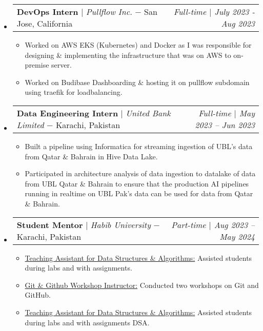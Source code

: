 \documentclass[letterpaper,10pt]{article}
\makeatletter
\newcommand{\subheadingtitlevspace}{
\vspace{-3pt}
}
\newcommand{\resumeItem}[1]{
  \item{
    {#1 \vspace{-4pt}}
  }
}
\newcommand{\titleItem}[1]{
  \textbf{#1}
}
\newcommand{\resumeSubheading}[4]{
  \item
     \begin{tabular*}{0.97\textwidth}[t]{l@{\extracolsep{\fill}}l@{}l}     
      {#1} & \titleItem{#3} | {#2} & \textit{#4}\\
    \end{tabular*}\vspace{-10pt}
}
\newcommand{\resumeProjectHeading}[2]{
    \item
    \begin{tabular*}{0.97\textwidth}{l@{\extracolsep{\fill}}r}
      #1 & \textit{ #2} \\
    \end{tabular*}\vspace{-9pt}
}
\newcommand{\resumeSubHeadingListStart}{\subheadingtitlevspace\begin{itemize}[leftmargin=0.15in, label={}]}
\newcommand{\resumeSubHeadingListEnd}{\end{itemize}}
\newcommand{\resumeItemListStart}{
\begin{itemize}}
\newcommand{\resumeItemListEnd}{
\vspace{4pt}
\end{itemize}\vspace{-8pt}}
\makeatother
\begin{document}
\resumeSubHeadingListStart
\resumeProjectHeading
{\titleItem{{DevOps Intern}} $|$ \emph{Pullflow Inc.} $-$ \small{San Jose, California}}{\small{Full-time} $|$ July 2023 - Aug 2023}
\resumeItemListStart
\resumeItem{Worked on AWS EKS (Kubernetes) and Docker as I was responsible for
designing \& implementing the infrastructure that was on AWS to on-premise
server.}
\resumeItem{Worked on Budibase Dashboarding \& hosting it on
pullflow subdomain using traefik for loadbalancing.}
\resumeItemListEnd
\resumeSubHeadingListEnd

\resumeSubHeadingListStart
\resumeProjectHeading
{\titleItem{{Data Engineering Intern}} $|$ \emph{United Bank Limited} $-$ \small{Karachi, Pakistan}}{\small{Full-time} $|$ May 2023 -- Jun 2023}
\resumeItemListStart
\resumeItem{Built a pipeline using Informatica for streaming ingestion
of UBL’s data from Qatar \& Bahrain in Hive Data Lake.}
\resumeItem{Participated in architecture analysis of data ingestion to datalake
of data from UBL Qatar \& Bahrain to ensure that the production AI pipelines
running in realtime on UBL Pak's data can be used for data from Qatar \&
Bahrain.}
\resumeItemListEnd
\resumeSubHeadingListEnd


\resumeSubHeadingListStart
\resumeProjectHeading
{\titleItem{{Student Mentor}} $|$ \emph{Habib University} $-$ \small{Karachi, Pakistan}}{\small{Part-time} $|$ Aug 2023 -- May 2024}
\resumeItemListStart
\resumeItem{\underline{Teaching Assistant for Data Structures \& Algorithms:}
Assisted students during labs and with assignments.}
\resumeItem{\underline{Git \& Github Workshop Instructor:} Conducted
two workshops on Git and GitHub.}
\resumeItem{\underline{Teaching Assistant for Data Structures \& Algorithms:}
Assisted students during labs and with assignments DSA.}
\resumeItemListEnd
\resumeSubHeadingListEnd

\end{document}

